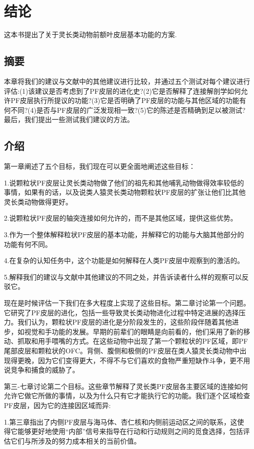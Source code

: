 \chapter{结论}
这本书提出了关于灵长类动物前额叶皮层基本功能的方案.

\section{摘要}
本章将我们的建议与文献中的其他建议进行比较，并通过五个测试对每个建议进行评估:(1)该建议是否考虑到了PF皮层的进化史?(2)它是否解释了连接解剖学如何允许PF皮层执行所提议的功能?(3)它是否明确了PF皮层的功能与其他区域的功能有何不同?(4)是否与PF皮层的广泛发现相一致?(5)它的陈述是否精确到足以被测试?最后，我们提出一些测试我们建议的方法。
\section{介绍}
第一章阐述了五个目标，我们现在可以更全面地阐述这些目标：
\par
1.说颗粒状PF皮层让灵长类动物做了他们的祖先和其他哺乳动物做得效率较低的事情，如果有的话，以及说类人猿灵长类动物颗粒状PF皮层的扩张让他们比其他灵长类动物做得更好。
\par
2.说颗粒状PF皮层的轴突连接如何允许的，而不是其他区域，提供这些优势。
\par
3.作为一个整体解释粒状PF皮层的基本功能，并解释它的功能与大脑其他部分的功能有何不同。
\par 
4.在复杂的认知任务中，这个功能是如何解释在人类PF皮层中观察到的激活的。
\par 
5.解释我们的建议与文献中其他建议的不同之处，并告诉读者什么样的观察可以反驳它。
\par 
现在是时候评估一下我们在多大程度上实现了这些目标。第二章讨论第一个问题。它研究了PF皮层的进化，包括一些导致灵长类动物进化过程中特定进展的选择压力。我们认为，颗粒状PF皮层的进化是分阶段发生的，这些阶段伴随着其他进步，如视觉和手功能的发展。早期的前辈们的眼睛是向前看的，他们采用了新的移动、抓取和用手喂嘴的方式。在这些动物中出现了第一个颗粒状的PF区域，即PF尾部皮层和颗粒状的OFC。背侧、腹侧和极侧的PF皮层在类人猿灵长类动物中出现得更晚，因为它们变得更大，不得不与它们喜欢的食物严重短缺作斗争，更不用说竞争和捕食的威胁了。
\par 
第三-七章讨论第二个目标。这些章节解释了灵长类PF皮层各主要区域的连接如何允许它做它所做的事情，以及为什么只有它才能执行它的功能。我们逐个区域检查PF皮层，因为它的连接因区域而异:
\par 
1.第三章指出了内侧PF皮层与海马体、杏仁核和内侧前运动区之间的联系，这使得它能够更好地使用“内部”信号来指导在行动和行动规则之间的觅食选择，包括评估它们与所涉及的努力成本相关的当前价值。
